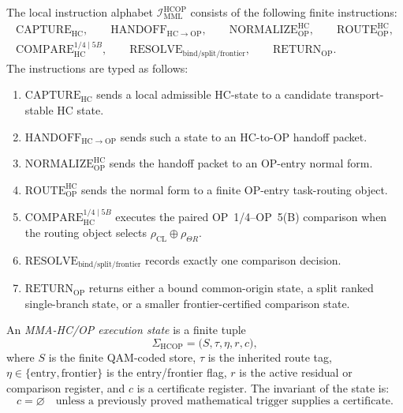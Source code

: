 \begin{definition}
\label{def:minimal-mml-hcop-instruction-alphabet}
The local instruction alphabet \(\mathcal I_{\mathrm{MML}}^{\mathrm{HCOP}}\) consists of the following finite instructions:
\[
\begin{gathered}
  \mathrm{CAPTURE}_{\mathrm{HC}},\qquad
  \mathrm{HANDOFF}_{\mathrm{HC}\to\mathrm{OP}},\qquad
  \mathrm{NORMALIZE}_{\mathrm{OP}}^{\mathrm{HC}},\qquad
  \mathrm{ROUTE}_{\mathrm{OP}}^{\mathrm{HC}},\\
  \mathrm{COMPARE}_{\mathrm{HC}}^{1/4\mid 5B},\qquad
  \mathrm{RESOLVE}_{\mathrm{bind/split/frontier}},\qquad
  \mathrm{RETURN}_{\mathrm{OP}}.
\end{gathered}
\]
The instructions are typed as follows:
\begin{enumerate}[leftmargin=2em,label=(\alph*)]
  \item \(\mathrm{CAPTURE}_{\mathrm{HC}}\) sends a local admissible HC-state to a candidate transport-stable HC state.
  \item \(\mathrm{HANDOFF}_{\mathrm{HC}\to\mathrm{OP}}\) sends such a state to an HC-to-OP handoff packet.
  \item \(\mathrm{NORMALIZE}_{\mathrm{OP}}^{\mathrm{HC}}\) sends the handoff packet to an OP-entry normal form.
  \item \(\mathrm{ROUTE}_{\mathrm{OP}}^{\mathrm{HC}}\) sends the normal form to a finite OP-entry task-routing object.
  \item \(\mathrm{COMPARE}_{\mathrm{HC}}^{1/4\mid 5B}\) executes the paired OP~1/4--OP~5(B) comparison when the routing object selects \(\rho_{\mathrm{CL}}\oplus\rho_{\Theta R}\).
  \item \(\mathrm{RESOLVE}_{\mathrm{bind/split/frontier}}\) records exactly one comparison decision.
  \item \(\mathrm{RETURN}_{\mathrm{OP}}\) returns either a bound common-origin state, a split ranked single-branch state, or a smaller frontier-certified comparison state.
\end{enumerate}
\end{definition}

\begin{definition}
\label{def:mma-execution-state-for-hcop-program}
An \emph{MMA-HC/OP execution state} is a finite tuple
\[
  \Sigma_{\mathrm{HCOP}}
  =
  \bigl(
    S,
    \tau,
    \eta,
    r,
    c
  \bigr),
\]
where \(S\) is the finite QAM-coded store, \(\tau\) is the inherited route tag, \(\eta\in\{\mathrm{entry},\mathrm{frontier}\}\) is the entry/frontier flag, \(r\) is the active residual or comparison register, and \(c\) is a certificate register. The invariant of the state is:
\[
  c=\varnothing
  \quad\text{unless a previously proved mathematical trigger supplies a certificate.}
\]
\end{definition}

